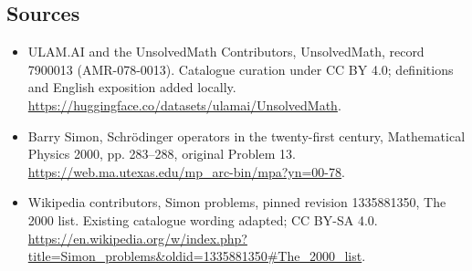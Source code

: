 \documentclass[11pt]{article}
\begin{document}
\subsection{Sources}
\begin{itemize}
\item[\hypertarget{source:7900013:1}{S1}] ULAM.AI and the UnsolvedMath Contributors, UnsolvedMath, record 7900013 (AMR-078-0013). Catalogue curation under CC BY 4.0; definitions and English exposition added locally.
\url{https://huggingface.co/datasets/ulamai/UnsolvedMath}.
\item[\hypertarget{source:7900013:2}{S2}] Barry Simon, Schrödinger operators in the twenty-first century, Mathematical Physics 2000, pp. 283–288, original Problem 13.
\url{https://web.ma.utexas.edu/mp_arc-bin/mpa?yn=00-78}.
\item[\hypertarget{source:7900013:3}{S3}] Wikipedia contributors, Simon problems, pinned revision 1335881350, The 2000 list. Existing catalogue wording adapted; CC BY-SA 4.0.
\url{https://en.wikipedia.org/w/index.php?title=Simon_problems&oldid=1335881350#The_2000_list}.
\end{itemize}
\label{end:7900013}
\end{document}
